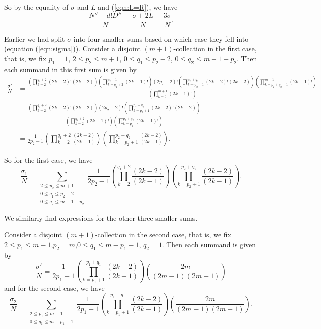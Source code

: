 \documentclass[11pt]{article}
\theoremstyle{mythm}
\begin{document}
So by the equality of $\sigma$ and $L$ and (\ref{eqn:L=R}), we have
\begin{equation*}
\frac{N''-d!D''}{N} = \frac{\sigma + 2L}{N} = \frac{3\sigma}{N}.
\end{equation*}

Earlier we had split $\sigma$ into four smaller sums based on which case they fell into (equation (\ref{eqn:sigma})). Consider a disjoint $(m+1)$-collection in the first case, that is, we fix $p_1 = 1$, $2\leq p_2\leq m+1$, $0\leq q_1\leq p_2 - 2$, $0\leq q_2 \leq m+1-p_2$. Then each summand in this first sum is given by
\begin{align*}
\frac{\sigma'}{N} &= \frac{\left(\prod\limits_{k=2}^{q_1+2}(2k-2)!(2k-2)\right)\left(\prod\limits_{k=q_1+2}^{p_2-1}(2k-1)!\right)(2p_2-2)!\left(\prod\limits_{k=p_2+1}^{p_2+q_2}(2k-2)!(2k-2)\right)\left(\prod\limits_{k=p_2+q_2+1}^{m+1}(2k-1)!\right)}{\left(\prod\limits_{k=0}^{m+1}(2k-1)!\right)} \\
&= \frac{\left(\prod\limits_{k=2}^{q_1+2}(2k-2)!(2k-2)\right)(2p_2-2)!\left(\prod\limits_{k=p_2+1}^{p_2+q_2}(2k-2)!(2k-2)\right)}{\left(\prod\limits_{k=2}^{q_1+2}(2k-1)!\right)\left(\prod\limits_{k=p_2}^{p_2+q_2}(2k-1)!\right)} \\
&= \frac{1}{2p_2-1}\left(\prod\limits_{k=2}^{q_1+2}\frac{(2k-2)}{(2k-1)}\right)\left(\prod\limits_{k=p_2+1}^{p_2+q_2}\frac{(2k-2)}{(2k-1)}\right).
\end{align*}

So for the first case, we have
\begin{equation}\label{eqn:sigma1}
\frac{\sigma_1}{N} = \sum\limits_{\substack{2\leq p_2\leq m+1 \\ 0\leq q_1 \leq p_2-2 \\ 0\leq q_2 \leq m+1-p_2}}\frac{1}{2p_2-1}\left(\prod\limits_{k=2}^{q_1+2}\frac{(2k-2)}{(2k-1)}\right)\left(\prod\limits_{k=p_2+1}^{p_2+q_2}\frac{(2k-2)}{(2k-1)}\right).
\end{equation}

We similarly find expressions for the other three smaller sums.

Consider a disjoint $(m+1)$-collection in the second case, that is, we fix $2\leq p_1\leq m-1$,$p_2=m$,$0\leq q_1\leq m-p_1-1$, $q_2 = 1$. Then each summand is given by
\begin{equation*}
\frac{\sigma'}{N} = \frac{1}{2p_1-1}\left(\prod\limits_{k=p_1+1}^{p_1+q_1}\frac{(2k-2)}{(2k-1)}\right)\left(\frac{2m}{(2m-1)(2m+1)}\right)
\end{equation*}
and for the second case, we have
\begin{equation}\label{eqn:sigma2}
\frac{\sigma_2}{N} = \sum\limits_{\substack{2\leq p_1\leq m-1 \\ 0\leq q_1\leq m-p_1-1}}\frac{1}{2p_1-1}\left(\prod\limits_{k=p_1+1}^{p_1+q_1}\frac{(2k-2)}{(2k-1)}\right)\left(\frac{2m}{(2m-1)(2m+1)}\right).
\end{equation}
\end{document}
